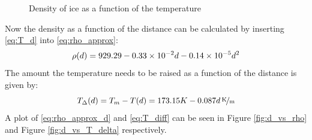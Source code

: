 \begin{figure}[htb]
	\centering
	\caption{Density of ice as a function of the temperature}
\end{figure}
Now the density as a function of the distance can be calculated by inserting \eqref{eq:T_d} into \eqref{eq:rho_approx}:
\begin{equation}\label{eq:rho_approx_d}
	\rho(d) = 929.29 - 0.33 \times 10^{-2} d - 0.14 \times 10^{-5} d^2
\end{equation}
The amount the temperature needs to be raised as a function of the distance is given by:
\begin{equation}\label{eq:T_diff}
	T_\Delta(d) = T_m - T(d) = 173.15 K - \unitfrac[0.087 d]{K}{m}
\end{equation}
A plot of \eqref{eq:rho_approx_d} and \eqref{eq:T_diff} can be seen in Figure \ref{fig:d_vs_rho} and Figure \ref{fig:d_vs_T_delta} respectively.
